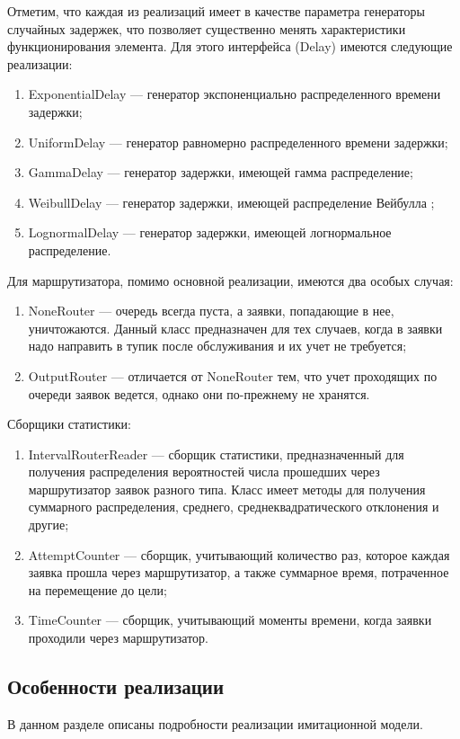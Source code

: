 Отметим, что каждая из реализаций имеет в качестве параметра генераторы случайных задержек, что позволяет существенно менять характеристики функционирования элемента. Для этого интерфейса (Delay) имеются следующие реализации:
\begin{enumerate}
	\item ExponentialDelay --- генератор экспоненциально распределенного времени задержки;
	\item UniformDelay --- генератор равномерно распределенного времени задержки;
	\item GammaDelay --- генератор задержки, имеющей гамма распределение;
 	\item WeibullDelay --- генератор задержки, имеющей распределение Вейбулла \cite{hallinan1993review};
 	\item LognormalDelay --- генератор задержки, имеющей логнормальное распределение.
\end{enumerate}

Для маршрутизатора, помимо основной реализации, имеются два особых случая:
\begin{enumerate}
	\item NoneRouter --- очередь всегда пуста, а заявки, попадающие в нее, уничтожаются. Данный класс предназначен для тех случаев, когда в заявки надо направить в тупик после обслуживания и их учет не требуется;
	\item OutputRouter --- отличается от NoneRouter тем, что учет проходящих по очереди заявок ведется, однако они по-прежнему не хранятся.
\end{enumerate}

Сборщики статистики:
\begin{enumerate}
	\item IntervalRouterReader --- сборщик статистики, предназначенный для получения распределения вероятностей числа прошедших через маршрутизатор заявок разного типа. Класс имеет методы для получения суммарного распределения, среднего, среднеквадратического отклонения и другие;
	\item AttemptCounter --- сборщик, учитывающий количество раз, которое каждая заявка прошла через маршрутизатор, а также суммарное время, потраченное на перемещение до цели;
	\item TimeCounter --- сборщик, учитывающий моменты времени, когда заявки проходили через маршрутизатор.
\end{enumerate}

\subsection{Особенности реализации}
В данном разделе описаны подробности реализации имитационной модели.

